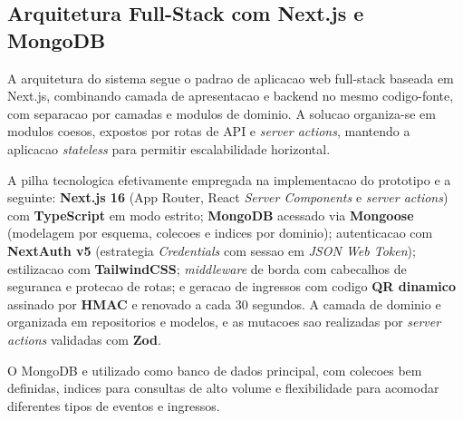 \subsection{Arquitetura Full-Stack com Next.js e MongoDB}

A arquitetura do sistema segue o padrao de aplicacao web full-stack baseada em Next.js, combinando camada de apresentacao e backend no mesmo codigo-fonte, com separacao por camadas e modulos de dominio. A solucao organiza-se em modulos coesos, expostos por rotas de API e \textit{server actions}, mantendo a aplicacao \textit{stateless} para permitir escalabilidade horizontal.

A pilha tecnologica efetivamente empregada na implementacao do prototipo e a seguinte: \textbf{Next.js 16} (App Router, React \textit{Server Components} e \textit{server actions}) com \textbf{TypeScript} em modo estrito; \textbf{MongoDB} acessado via \textbf{Mongoose} (modelagem por esquema, colecoes e indices por dominio); autenticacao com \textbf{NextAuth v5} (estrategia \textit{Credentials} com sessao em \textit{JSON Web Token}); estilizacao com \textbf{TailwindCSS}; \textit{middleware} de borda com cabecalhos de seguranca e protecao de rotas; e geracao de ingressos com codigo \textbf{QR dinamico} assinado por \textbf{HMAC} e renovado a cada 30 segundos. A camada de dominio e organizada em repositorios e modelos, e as mutacoes sao realizadas por \textit{server actions} validadas com \textbf{Zod}.

O MongoDB e utilizado como banco de dados principal, com colecoes bem definidas, indices para consultas de alto volume e flexibilidade para acomodar diferentes tipos de eventos e ingressos.

